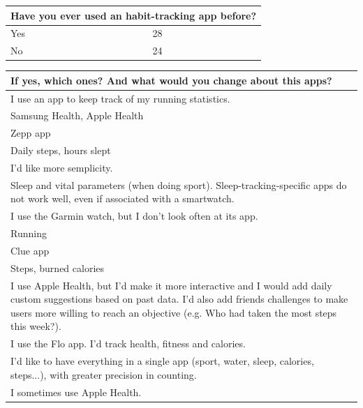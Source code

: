 \documentclass{article}
\begin{document}
\begin{table}[H]
    \centering
    \begin{tabularx}{0.9\textwidth}{X|p{1in}}
        \hline
        \multicolumn{2}{l}{\textbf{Have you ever used an habit-tracking app before?}} \\
        \hline
        Yes & 28 \\
        \hline
        No & 24 \\
        \hline
    \end{tabularx}
\end{table}

\begin{table}[H]
    \centering
    \begin{tabularx}{0.9\textwidth}{X}
        \hline
        \textbf{If yes, which ones? And what would you change about this apps?} \\
        \hline
        I use an app to keep track of my running statistics. \\
        \hline
        Samsung Health, Apple Health \\
        \hline
        Zepp app \\
        \hline
        Daily steps, hours slept \\
        \hline
        I'd like more semplicity. \\
        \hline
        Sleep and vital parameters (when doing sport). Sleep-tracking-specific apps do not work well, even if associated with a smartwatch. \\
        \hline
        I use the Garmin watch, but I don't look often at its app. \\
        \hline
        Running \\
        \hline
        Clue app \\
        \hline
        Steps, burned calories \\
        \hline
        I use Apple Health, but I'd make it more interactive and I would add daily custom suggestions based on past data. I'd also add friends challenges to make users more willing to reach an objective (e.g. Who had taken the most steps this week?). \\
        \hline
        I use the Flo app. I'd track health, fitness and calories. \\
        \hline
        I'd like to have everything in a single app (sport, water, sleep, calories, steps...), with greater precision in counting. \\
        \hline
        I sometimes use Apple Health. \\

\end{tabularx}
\end{table}
\end{document}
